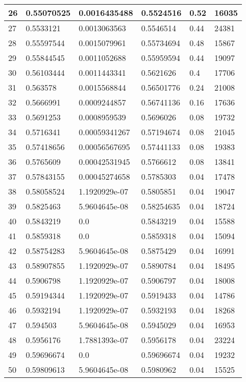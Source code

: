\begin{longtable}{|l|l|l|l|l|l|}
26 & 0.55070525 & 0.0016435488 & 0.5524516 & 0.52 & 16035 \\ \hline 
27 & 0.5533121 & 0.0013063563 & 0.5546514 & 0.44 & 24381 \\ \hline 
28 & 0.55597544 & 0.0015079961 & 0.55734694 & 0.48 & 15867 \\ \hline 
29 & 0.55844545 & 0.0011052688 & 0.55959594 & 0.44 & 19097 \\ \hline 
30 & 0.56103444 & 0.0011443341 & 0.5621626 & 0.4 & 17706 \\ \hline 
31 & 0.563578 & 0.0015568844 & 0.56501776 & 0.24 & 21008 \\ \hline 
32 & 0.5666991 & 0.0009244857 & 0.56741136 & 0.16 & 17636 \\ \hline 
33 & 0.5691253 & 0.0008959539 & 0.5696026 & 0.08 & 19732 \\ \hline 
34 & 0.5716341 & 0.00059341267 & 0.57194674 & 0.08 & 21045 \\ \hline 
35 & 0.57418656 & 0.00056567695 & 0.57441133 & 0.08 & 19383 \\ \hline 
36 & 0.5765609 & 0.00042531945 & 0.5766612 & 0.08 & 13841 \\ \hline 
37 & 0.57843155 & 0.00045274658 & 0.5785303 & 0.04 & 17478 \\ \hline 
38 & 0.58058524 & 1.1920929e-07 & 0.5805851 & 0.04 & 19047 \\ \hline 
39 & 0.5825463 & 5.9604645e-08 & 0.58254635 & 0.04 & 18724 \\ \hline 
40 & 0.5843219 & 0.0 & 0.5843219 & 0.04 & 15588 \\ \hline 
41 & 0.5859318 & 0.0 & 0.5859318 & 0.04 & 15094 \\ \hline 
42 & 0.58754283 & 5.9604645e-08 & 0.5875429 & 0.04 & 16991 \\ \hline 
43 & 0.58907855 & 1.1920929e-07 & 0.5890784 & 0.04 & 18495 \\ \hline 
44 & 0.5906798 & 1.1920929e-07 & 0.5906797 & 0.04 & 18008 \\ \hline 
45 & 0.59194344 & 1.1920929e-07 & 0.5919433 & 0.04 & 14786 \\ \hline 
46 & 0.5932194 & 1.1920929e-07 & 0.5932193 & 0.04 & 18268 \\ \hline 
47 & 0.594503 & 5.9604645e-08 & 0.5945029 & 0.04 & 16953 \\ \hline 
48 & 0.5956176 & 1.7881393e-07 & 0.5956178 & 0.04 & 23224 \\ \hline 
49 & 0.59696674 & 0.0 & 0.59696674 & 0.04 & 19232 \\ \hline 
50 & 0.59809613 & 5.9604645e-08 & 0.5980962 & 0.04 & 15525 \\ \hline 

\end{longtable}
